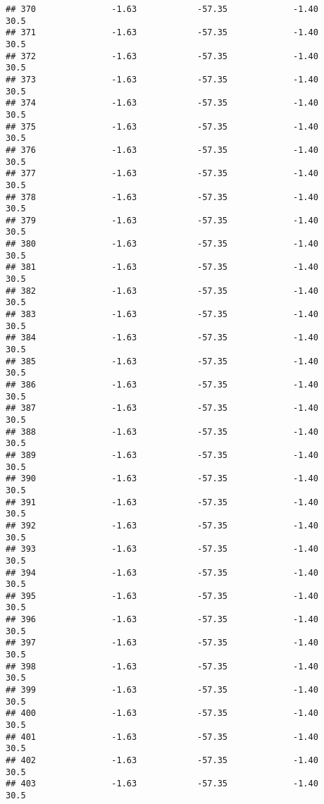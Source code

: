 \documentclass[]{article}
\begin{document}
\begin{verbatim}
## 370               -1.63            -57.35             -1.40           30.5
## 371               -1.63            -57.35             -1.40           30.5
## 372               -1.63            -57.35             -1.40           30.5
## 373               -1.63            -57.35             -1.40           30.5
## 374               -1.63            -57.35             -1.40           30.5
## 375               -1.63            -57.35             -1.40           30.5
## 376               -1.63            -57.35             -1.40           30.5
## 377               -1.63            -57.35             -1.40           30.5
## 378               -1.63            -57.35             -1.40           30.5
## 379               -1.63            -57.35             -1.40           30.5
## 380               -1.63            -57.35             -1.40           30.5
## 381               -1.63            -57.35             -1.40           30.5
## 382               -1.63            -57.35             -1.40           30.5
## 383               -1.63            -57.35             -1.40           30.5
## 384               -1.63            -57.35             -1.40           30.5
## 385               -1.63            -57.35             -1.40           30.5
## 386               -1.63            -57.35             -1.40           30.5
## 387               -1.63            -57.35             -1.40           30.5
## 388               -1.63            -57.35             -1.40           30.5
## 389               -1.63            -57.35             -1.40           30.5
## 390               -1.63            -57.35             -1.40           30.5
## 391               -1.63            -57.35             -1.40           30.5
## 392               -1.63            -57.35             -1.40           30.5
## 393               -1.63            -57.35             -1.40           30.5
## 394               -1.63            -57.35             -1.40           30.5
## 395               -1.63            -57.35             -1.40           30.5
## 396               -1.63            -57.35             -1.40           30.5
## 397               -1.63            -57.35             -1.40           30.5
## 398               -1.63            -57.35             -1.40           30.5
## 399               -1.63            -57.35             -1.40           30.5
## 400               -1.63            -57.35             -1.40           30.5
## 401               -1.63            -57.35             -1.40           30.5
## 402               -1.63            -57.35             -1.40           30.5
## 403               -1.63            -57.35             -1.40           30.5

\end{verbatim}
\end{document}
